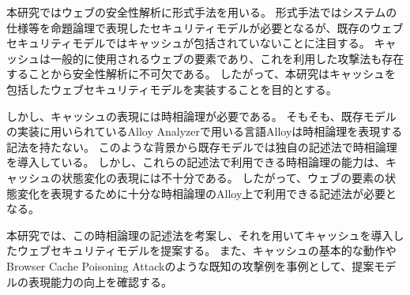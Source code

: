 \documentclass[journal]{IEEEtran}
\begin{document}
本研究ではウェブの安全性解析に形式手法を用いる。
形式手法ではシステムの仕様等を命題論理で表現したセキュリティモデルが必要となるが、既存のウェブセキュリティモデルではキャッシュが包括されていないことに注目する。
キャッシュは一般的に使用されるウェブの要素であり、これを利用した攻撃法も存在することから安全性解析に不可欠である。
したがって、本研究はキャッシュを包括したウェブセキュリティモデルを実装することを目的とする。

しかし、キャッシュの表現には時相論理が必要である。
そもそも、既存モデルの実装に用いられているAlloy Analyzerで用いる言語Alloyは時相論理を表現する記法を持たない。
このような背景から既存モデルでは独自の記述法で時相論理を導入している。
しかし、これらの記述法で利用できる時相論理の能力は、キャッシュの状態変化の表現には不十分である。
したがって、ウェブの要素の状態変化を表現するために十分な時相論理のAlloy上で利用できる記述法が必要となる。

本研究では、この時相論理の記述法を考案し、それを用いてキャッシュを導入したウェブセキュリティモデルを提案する。
また、キャッシュの基本的な動作やBrowser Cache Poisoning Attackのような既知の攻撃例を事例として、提案モデルの表現能力の向上を確認する。
\end{document}
